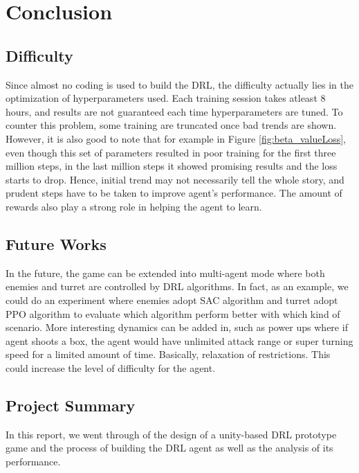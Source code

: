 
\chapter{Conclusion}


\section{Difficulty}
Since almost no coding is used to build the DRL, the difficulty actually lies in the optimization of hyperparameters used. Each training session takes atleast 8 hours, and results are not guaranteed each time hyperparameters are tuned. To counter this problem, some training are truncated once bad trends are shown. However, it is also good to note that for example in Figure \ref{fig:beta_valueLoss}, even though this set of parameters resulted in poor training for the first three million steps, in the last million steps it showed promising results and the loss starts to drop. Hence, initial trend may not necessarily tell the whole story, and prudent steps have to be taken to improve agent's performance. The amount of rewards also play a strong role in helping the agent to learn.

\section{Future Works}
In the future, the game can be extended into multi-agent mode where both enemies and turret are controlled by DRL algorithms. In fact, as an example, we could do an experiment where enemies adopt SAC algorithm and turret adopt PPO algorithm to evaluate which algorithm perform better with which kind of scenario. More interesting dynamics can be added in, such as power ups where if agent shoots a box, the agent would have unlimited attack range or super turning speed for a limited amount of time. Basically, relaxation of restrictions.  This could increase the level of difficulty for the agent.

\section{Project Summary}
In this report, we went through of the design of a unity-based DRL prototype game and the process of building the DRL agent as well as the analysis of its performance.


